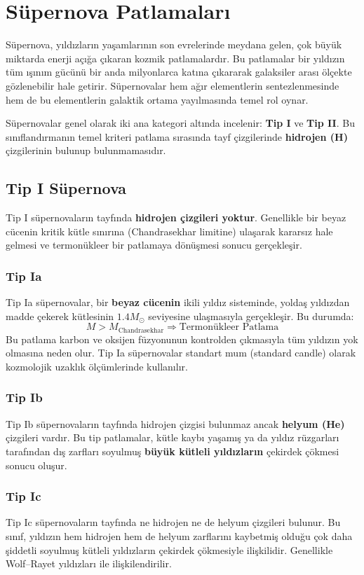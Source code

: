\section{Süpernova Patlamaları}

Süpernova, yıldızların yaşamlarının son evrelerinde meydana gelen, çok büyük miktarda enerji açığa çıkaran kozmik patlamalardır. Bu patlamalar bir yıldızın tüm ışınım gücünü bir anda milyonlarca katına çıkararak galaksiler arası ölçekte gözlenebilir hale getirir. Süpernovalar hem ağır elementlerin sentezlenmesinde hem de bu elementlerin galaktik ortama yayılmasında temel rol oynar.

Süpernovalar genel olarak iki ana kategori altında incelenir: \textbf{Tip I} ve \textbf{Tip II}. Bu sınıflandırmanın temel kriteri patlama sırasında tayf çizgilerinde \textbf{hidrojen (H)} çizgilerinin bulunup bulunmamasıdır.

\subsection{Tip I Süpernova}
Tip I süpernovaların tayfında \textbf{hidrojen çizgileri yoktur}. Genellikle bir beyaz cücenin kritik kütle sınırına (Chandrasekhar limitine) ulaşarak kararsız hale gelmesi ve termonükleer bir patlamaya dönüşmesi sonucu gerçekleşir.

\subsubsection{Tip Ia}
Tip Ia süpernovalar, bir \textbf{beyaz cücenin} ikili yıldız sisteminde, yoldaş yıldızdan madde çekerek kütlesinin $1.4 M_{\odot}$ seviyesine ulaşmasıyla gerçekleşir. Bu durumda:
\[
M > M_{\text{Chandrasekhar}} \Rightarrow \text{Termonükleer Patlama}
\]
Bu patlama karbon ve oksijen füzyonunun kontrolden çıkmasıyla tüm yıldızın yok olmasına neden olur. Tip Ia süpernovalar standart mum (standard candle) olarak kozmolojik uzaklık ölçümlerinde kullanılır.

\subsubsection{Tip Ib}
Tip Ib süpernovaların tayfında hidrojen çizgisi bulunmaz ancak \textbf{helyum (He)} çizgileri vardır. Bu tip patlamalar, kütle kaybı yaşamış ya da yıldız rüzgarları tarafından dış zarfları soyulmuş \textbf{büyük kütleli yıldızların} çekirdek çökmesi sonucu oluşur.

\subsubsection{Tip Ic}
Tip Ic süpernovaların tayfında ne hidrojen ne de helyum çizgileri bulunur. Bu sınıf, yıldızın hem hidrojen hem de helyum zarflarını kaybetmiş olduğu çok daha şiddetli soyulmuş kütleli yıldızların çekirdek çökmesiyle ilişkilidir. Genellikle Wolf–Rayet yıldızları ile ilişkilendirilir.

